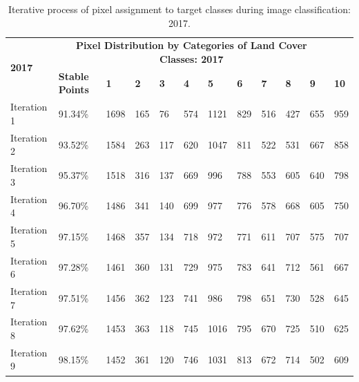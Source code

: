 \documentclass[jimaging,article,accept,pdftex,moreauthors]{Definitions/mdpi}
\begin{document}
\vspace{-6pt}
\begin{table}[H]\scriptsize  
 \caption{Iterative process of pixel assignment to target classes during image classification: 2017.}
  \centering
\begin{tabularx}{\textwidth}{p{1.6cm}p{1.8cm}p{0.55cm}p{0.55cm}p{0.55cm}p{0.55cm}p{0.55cm}p{0.55cm}p{0.55cm}p{0.55cm}p{0.55cm}p{0.9cm}}
  \toprule
  \multirow{2}{*}{\textbf{2017}} & \multicolumn{10}{c}{\textbf{Pixel Distribution by Categories of Land Cover Classes: 2017}} \\
     & \textbf{Stable Points} %
     & \textbf{1} & \textbf{2} &  \textbf{3} & \textbf{4} & \textbf{5} & \textbf{6} & \textbf{7} & \textbf{8} &\textbf{ 9} & \textbf{10} \\
    \midrule
    Iteration 1 & 91.34\% & 1698    &    165   &      76    &    574    &   1121 &
        829    &    516    &    427   &     655     &   959 \\
    Iteration 2 & 93.52\% &  1584   &     263    &    117   &     620   &    1047&
        811   &     522   &     531    &    667     &   858 \\
    Iteration 3 & 95.37\% &  1518     &   316   &     137    &    669    &    996&
        788   &     553    &    605   &     640    &    798 \\
    Iteration 4 & 96.70\% & 1486    &    341   &     140     &   699      &  977&
        776  &      578    &    668   &     605     &   750 \\
    Iteration 5 & 97.15\% & 1468    &    357    &   134    &    718     &   972&
        771    &    611    &    707   &     575    &    707 \\
    Iteration 6 & 97.28\% & 1461   &     360  &      131  &      729    &    975&
        783   &     641     &   712    &    561     &   667 \\
    Iteration 7 & 97.51\% & 1456   &     362  &      123    &    741     &  986&
        798     &   651    &    730   &     528    &    645\\
    Iteration 8 & 97.62\% & 1453   &     363  &      118    &    745    &   1016&
        795   &     670    &    725   &     510      &  625 \\
    Iteration 9 & 98.15\% &  1452   &     361 &       120       & 746     &  1031&
        813   &     672 &     714   &     502     &   609\\
\bottomrule
\end{tabularx}
 
  \label{tabB2}
\end{table}
\end{document}
